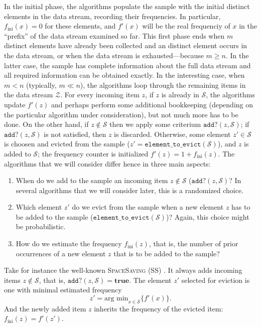 \documentclass{article}
\newcommand{\esimo}[1]{\text{${#1}$-th}}              %
\begin{document}
In the initial phase, the algorithms populate the sample with the
initial distinct elements in the data stream, recording their
frequencies. In particular, $f_\text{ini}(x)=0$ for these elements,
and $f'(x)$ will be the real frequenciy of $x$ in the ``prefix'' of
the data stream examined so far.  This first phase ends when $m$
distinct elements have already been collected and an \esimo{(m+1)}
distinct element occurs in the data stream, or when the data stream is
exhausted---because $m\ge n$.  In the latter case, the sample has
complete information about the full data stream and all required
information can be obtained exactly.  In the interesting case, when $m
< n$ (typically, $m\ll n$), the algorithms loop through the remaining
items in the data stream $\mathcal{Z}$. For every incoming item $z$,
if $z$ is already in $\mathcal{S}$, the algorithms update $f'(z)$ and
perhaps perform some additional bookkeeping (depending on the
particular algorithm under consideration), but not much more has to be
done. On the other hand, if $z\not\in\mathcal{S}$ then we apply some
criterium $\texttt{add?}(z,\mathcal{S})$;
if $\texttt{add?}(z,\mathcal{S})$ is not satisfied,
then $z$ is discarded. Otherwise, some element $z'\in\mathcal{S}$ is choosen
and evicted from the sample ($z'=\texttt{element\_to\_evict}(\mathcal{S})$),
and $z$ is added to $\mathcal{S}$; the frequency counter is initialized
$f'(z)=1+f_\text{ini}(z)$. The algorithms that we will consider differ
hence in three main aspects:  
\begin{enumerate}
\item When do we add to the sample an incoming item $z\not\in\mathcal{S}$
  ($\texttt{add?}(z,\mathcal{S})$? In several algorithms that we will
  consider later, this is a randomized choice.
\item Which element $z'$ do we evict from the sample when a new element
  $z$ has to be added to the sample
  ($\texttt{element\_to\_evict}(\mathcal{S})$)?
  Again, this choice might be probabilistic.
\item How do we estimate the frequency $f_\text{ini}(z)$, that is, the number
  of prior occurrences of a new element $z$ that is to be added to the sample?
\end{enumerate}

Take for instance the well-known \textsc{SpaceSaving} (SS) \cite{SpaceSaving}.
It always
adds incoming items $z\not\in\mathcal{S}$, that is,
$\texttt{add?}(z,\mathcal{S})=\textbf{true}$. The element $z'$ selected
for eviction is one with minimal estimated frequency
\[
z' = \text{arg min}_{x\in\mathcal{S}}\{f'(x)\}.
\]
And the newly added item $z$ inherits the frequency of the evicted item:
$f_\text{ini}(z)=f'(z')$.
\end{document}
